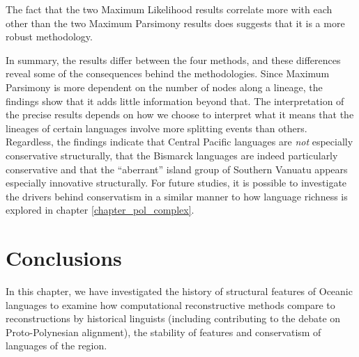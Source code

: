 \documentclass[draft,10pt]{article} %
\begin{document}
The fact that the two Maximum Likelihood results correlate more with each other than the two Maximum Parsimony results does suggests that it is a more robust methodology.

In summary, the results differ between the four methods, and these differences reveal some of the consequences behind the methodologies. Since Maximum Parsimony is more dependent on the number of nodes along a lineage, the findings show that it adds little information beyond that. The interpretation of the precise results depends on how we choose to interpret what it means that the lineages of certain languages involve more splitting events than others. Regardless, the findings indicate that Central Pacific languages are \emph{not} especially conservative structurally, that the Bismarck languages are indeed particularly conservative and that the ``aberrant'' island group of Southern Vanuatu appears especially innovative structurally. For future studies, it is possible to investigate the drivers behind conservatism in a similar manner to how language richness is explored in chapter \ref{chapter_pol_complex}.




\section{Conclusions}
In this chapter, we have investigated the history of structural features of Oceanic languages to examine how computational reconstructive methods compare to reconstructions by historical linguists (including contributing to the debate on Proto-Polynesian alignment), the stability of features and conservatism of languages of the region.
\end{document}
